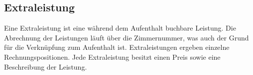 \documentclass[../../Pflichtenheft.tex]{subfiles}
\begin{document}
    \subsection{Extraleistung}
    Eine Extraleistung ist eine während dem Aufenthalt buchbare Leistung. Die Abrechnung
    der Leistungen läuft über die Zimmernummer, was auch der Grund für die Verknüpfung zum
    Aufenthalt ist. Extraleistungen ergeben einzelne Rechnungspositionen. Jede Extraleistung
    besitzt einen Preis sowie eine Beschreibung der Leistung.
\end{document}
